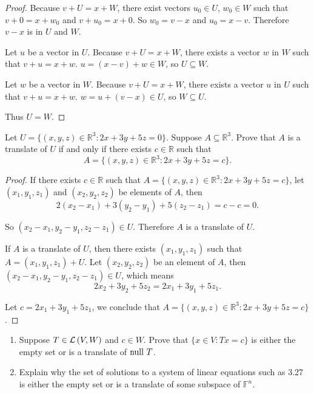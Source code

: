 \begin{proof}
    Because $v + U = x + W$, there exist vectors $u_{0}\in U$, $w_{0}\in W$ such that $v + 0 = x + w_{0}$ and $v + u_{0} = x + 0$. So $w_{0} = v - x$ and $u_{0} = x - v$. Therefore $v - x$ is in $U$ and $W$.

    Let $u$ be a vector in $U$. Because $v + U = x + W$, there exists a vector $w$ in $W$ such that $v + u = x + w$. $u = (x - v) + w\in W$, so $U\subseteq W$.

    Let $w$ be a vector in $W$. Because $v + U = x + W$, there exists a vector $u$ in $U$ such that $v + u = x + w$. $w = u + (v - x)\in U$, so $W\subseteq U$.

    Thus $U = W$.
\end{proof}
\newpage

\begin{exercise}
    Let $U = \{(x, y, z) \in \mathbb{R}^{3}: 2x + 3y + 5z = 0\}$. Suppose $A \subseteq \mathbb{R}^{3}$. Prove that $A$ is a translate of $U$ if and only if there exists $c\in\mathbb{R}$ such that
    \[
        A = \{ (x, y, z)\in\mathbb{R}^{3}: 2x + 3y + 5z = c \}.
    \]
\end{exercise}

\begin{proof}
    If there exists $c\in\mathbb{R}$ such that $A = \{ (x, y, z)\in\mathbb{R}^{3}: 2x + 3y + 5z = c \}$, let $(x_{1}, y_{1}, z_{1})$ and $(x_{2}, y_{2}, z_{2})$ be elements of $A$, then
    \[
        2(x_{2} - x_{1}) + 3(y_{2} - y_{1}) + 5(z_{2} - z_{1}) = c - c = 0.
    \]

    So $(x_{2} - x_{1}, y_{2} - y_{1}, z_{2} - z_{1})\in U$. Therefore $A$ is a translate of $U$.

    \bigskip
    If $A$ is a translate of $U$, then there exists $(x_{1}, y_{1}, z_{1})$ such that $A = (x_{1}, y_{1}, z_{1}) + U$. Let $(x_{2}, y_{2}, z_{2})$ be an element of $A$, then $(x_{2} - x_{1}, y_{2} - y_{1}, z_{2} - z_{1})\in U$, which means
    \[
        2x_{2} + 3y_{2} + 5z_{2} = 2x_{1} + 3y_{1} + 5z_{1}.
    \]

    Let $c = 2x_{1} + 3y_{1} + 5z_{1}$, we conclude that $A = \{ (x, y, z)\in\mathbb{R}^{3}: 2x + 3y + 5z = c \}$.
\end{proof}
\newpage

\begin{exercise}
    \begin{enumerate}[label={(\alph*)}]
        \item Suppose $T \in \mathcal{L}\left({V, W}\right)$ and $c \in W$. Prove that $\{x \in V : Tx = c\}$ is either the empty set or is a translate of $\operatorname{null}\,{T}$.
        \item Explain why the set of solutions to a system of linear equations such as 3.27 is either the empty set or is a translate of some subspace of $\mathbb{F}^{n}$.
    \end{enumerate}
\end{exercise}

